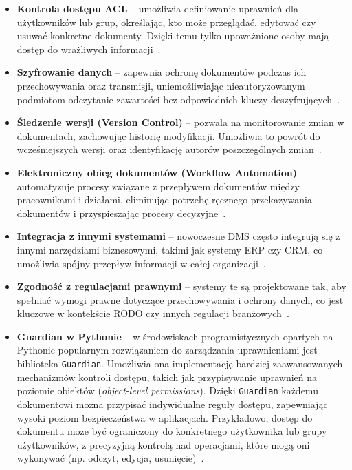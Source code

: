\begin{itemize}
	\item \textbf{Kontrola dostępu ACL} -- umożliwia definiowanie uprawnień dla użytkowników lub grup, określając, kto może przeglądać, edytować czy usuwać konkretne dokumenty. Dzięki temu tylko upoważnione osoby mają dostęp do wrażliwych informacji~\cite{acl, acl_2}.
	
	\item \textbf{Szyfrowanie danych} -- zapewnia ochronę dokumentów podczas ich przechowywania oraz transmisji, uniemożliwiając nieautoryzowanym podmiotom odczytanie zawartości bez odpowiednich kluczy deszyfrujących~\cite{szyrowanie_danych}.

	\item \textbf{Śledzenie wersji (Version Control)} -- pozwala na monitorowanie zmian w dokumentach, zachowując historię modyfikacji. Umożliwia to powrót do wcześniejszych wersji oraz identyfikację autorów poszczególnych zmian~\cite{kotntrola_wersji}. 
	
	\item \textbf{Elektroniczny obieg dokumentów (Workflow Automation)} -- automatyzuje procesy związane z przepływem dokumentów między pracownikami i działami, eliminując potrzebę ręcznego przekazywania dokumentów i przyspieszając procesy decyzyjne~\cite{workflow_utomation}.

	\item \textbf{Integracja z innymi systemami} -- nowoczesne DMS często integrują się z innymi narzędziami biznesowymi, takimi jak systemy ERP czy CRM, co umożliwia spójny przepływ informacji w całej organizacji~\cite{dms}. 

	\item \textbf{Zgodność z regulacjami prawnymi} -- systemy te są projektowane tak, aby spełniać wymogi prawne dotyczące przechowywania i ochrony danych, co jest kluczowe w kontekście RODO czy innych regulacji branżowych~\cite{rodo_dokumenty}.
	
	\item \textbf{Guardian w Pythonie} -- w środowiskach programistycznych opartych na Pythonie popularnym rozwiązaniem do zarządzania uprawnieniami jest biblioteka \texttt{Guardian}. Umożliwia ona implementację bardziej zaawansowanych mechanizmów kontroli dostępu, takich jak przypisywanie uprawnień na poziomie obiektów (\emph{object-level permissions}). Dzięki \texttt{Guardian} każdemu dokumentowi można przypisać indywidualne reguły dostępu, zapewniając wysoki poziom bezpieczeństwa w aplikacjach. Przykładowo, dostęp do dokumentu może być ograniczony do konkretnego użytkownika lub grupy użytkowników, z precyzyjną kontrolą nad operacjami, które mogą oni wykonywać (np. odczyt, edycja, usunięcie)~\cite{django_guardian}.  
	
\end{itemize}

